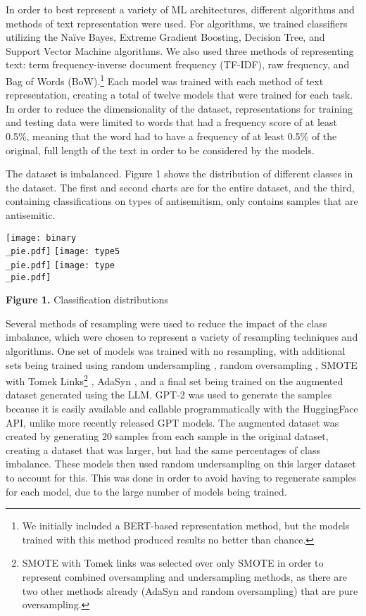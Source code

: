 \documentclass[runningheads]{llncs}
\newenvironment{nscenter}
 {\parskip=0pt\par\nopagebreak\centering}
 {\par\noindent\ignorespacesafterend}
\begin{document}
In order to best represent a variety of ML architectures, different algorithms and methods of text representation were used. For algorithms, we trained classifiers utilizing the Naïve Bayes, Extreme Gradient Boosting, Decision Tree, and Support Vector Machine algorithms. We also used three methods of representing text: term frequency-inverse document frequency (TF-IDF), raw frequency, and Bag of Words (BoW).\footnote{We initially included a BERT-based representation method, but the models trained with this method produced results no better than chance.} Each model was trained with each method of text representation, creating a total of twelve models that were trained for each task. In order to reduce the dimensionality of the dataset, representations for training and testing data were limited to words that had a frequency score of at least 0.5\%, meaning that the word had to have a frequency of at least 0.5\% of the original, full length of the text in order to be considered by the models.

The dataset is imbalanced. Figure 1 shows the distribution of different classes in the dataset. The first and second charts are for the entire dataset, and the third, containing classifications on types of antisemitism, only contains samples that are antisemitic.\\

\begin{nscenter}
\texttt{[image: binary\\\_pie.pdf]}
\texttt{[image: type5\\\_pie.pdf]}
\texttt{[image: type\\\_pie.pdf]}

{\bf Figure 1.} Classification distributions
\end{nscenter}

Several methods of resampling were used to reduce the impact of the class imbalance, which were chosen to represent a variety of resampling techniques and algorithms. One set of models was trained with no resampling, with additional sets being trained using random undersampling \cite{shelke}, random oversampling \cite{shelke}, SMOTE with Tomek Links\footnote{SMOTE with Tomek links was selected over only SMOTE in order to represent combined oversampling and undersampling methods, as there are two other methods already (AdaSyn and random oversampling) that are pure oversampling.} \cite{fernandez}, AdaSyn \cite{he}, and a final set being trained on the augmented dataset generated using the LLM. GPT-2 was used to generate the samples because it is easily available and callable programmatically with the HuggingFace API, unlike more recently released GPT models. The augmented dataset was created by generating 20 samples from each sample in the original dataset, creating a dataset that was larger, but had the same percentages of class imbalance. These models then used random undersampling on this larger dataset to account for this. This was done in order to avoid having to regenerate samples for each model, due to the large number of models being trained.
\end{document}
